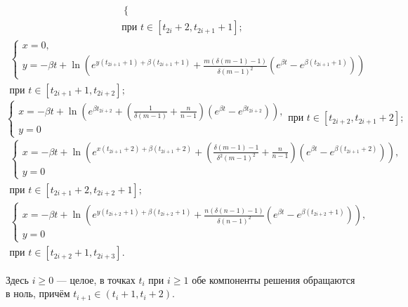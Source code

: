 \begin{theorem}
\begin{multline}
\begin{cases}
		\end{cases}\\
		\text{при } t \in [t_{2i} + 2, t_{2i + 1} + 1];
	\end{multline}
	\begin{multline}
		\label{eq:step6_solution}
		\begin{cases}
			x = 0,\\
			y = -\beta t + \ln\left(e^{y(t_{2i + 1} + 1) + \beta(t_{2i + 1} + 1)} + \frac{m (\delta (m - 1) - 1)}{\delta (m - 1)^2} (e^{\beta t} - e^{\beta (t_{2i + 1} + 1)}) \right)
		\end{cases}\\
		\text{при } t \in [t_{2i + 1} + 1, t_{2i + 2}];
	\end{multline}
	\begin{equation}
		\label{eq:step7_solution}
		\begin{cases}
			x = -\beta t + \ln\left(e^{\beta t_{2i + 2}} + \left(\frac{1}{\delta(m - 1)} + \frac{n}{n - 1}\right) (e^{\beta t} - e^{\beta t_{2i + 2}})\right),\\
			y = 0
		\end{cases}
		\text{при } t \in [t_{2i + 2}, t_{2i + 1} + 2];
	\end{equation}
	\begin{multline}
		\label{eq:step8_solution}
		\begin{cases}
			x = -\beta t + \ln\left(e^{x(t_{2i + 1} + 2) + \beta (t_{2i + 1} + 2)} + \left(\frac{\delta(m - 1) - 1}{\delta^2 (m - 1)^2} + \frac{n}{n - 1}\right) (e^{\beta t} - e^{\beta (t_{2i + 1} + 2)})\right),\\
			y = 0
		\end{cases}\\
		\text{при } t \in [t_{2i + 1} + 2, t_{2i + 2} + 1];
	\end{multline}
	\begin{multline}
		\label{eq:step9_solution}
		\begin{cases}
			x = -\beta t + \ln\left(e^{y(t_{2i + 2} + 1) + \beta(t_{2i + 2} + 1)} + \frac{n (\delta(n - 1) - 1)}{\delta (n - 1)^2} (e^{\beta t} - e^{\beta (t_{2i + 2} + 1)}) \right),\\
			y = 0
		\end{cases}\\
		\text{при } t \in [t_{2i + 2} + 1, t_{2i + 3}].
	\end{multline}
	
	Здесь $i \geqslant 0$ --- целое, в точках $t_i$ при $i \geq 1$ обе компоненты решения обращаются в ноль, причём $t_{i + 1} \in (t_i + 1, t_i + 2)$.
\end{theorem}

